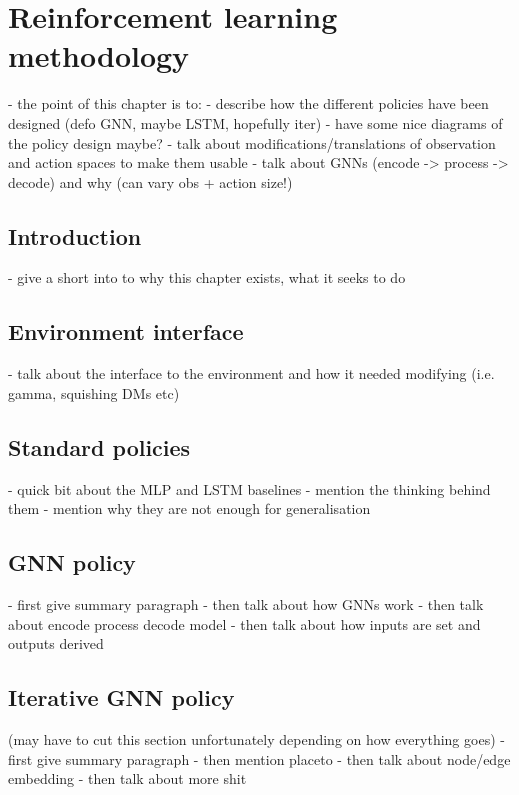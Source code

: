 \chapter{Reinforcement learning methodology}

- the point of this chapter is to:
  - describe how the different policies have been designed (defo GNN, maybe LSTM, hopefully iter)
  - have some nice diagrams of the policy design maybe?
  - talk about modifications/translations of observation and action spaces to make them usable
  - talk about GNNs (encode -> process -> decode) and why (can vary obs + action size!)
  
 \section{Introduction}
 
- give a short into to why this chapter exists, what it seeks to do

\section{Environment interface}

- talk about the interface to the environment and how it needed modifying (i.e. gamma, squishing DMs etc)

\section{Standard policies}

- quick bit about the MLP and LSTM baselines
- mention the thinking behind them
- mention why they are not enough for generalisation

\section{GNN policy}

- first give summary paragraph
- then talk about how GNNs work
- then talk about encode process decode model
- then talk about how inputs are set and outputs derived

\section{Iterative GNN policy}
(may have to cut this section unfortunately depending on how everything goes)
- first give summary paragraph
- then mention placeto
- then talk about node/edge embedding
- then talk about more shit